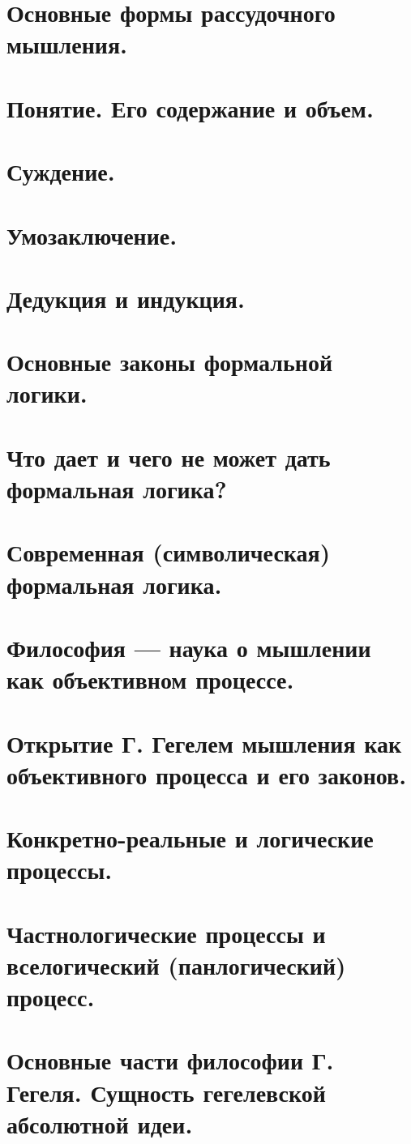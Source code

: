 \section{ Основные формы рассудочного мышления.}
\section{ Понятие. Его содержание и объем.}
\section{ Суждение.}
\section{ Умозаключение.}
\section{ Дедукция и индукция.}
\section{ Основные законы формальной логики.}
\section{ Что дает и чего не может дать формальная логика?}
\section{ Современная (символическая) формальная логика.}
\section{ Философия — наука о мышлении как объективном процессе.}
\section{ Открытие Г. Гегелем мышления как объективного процесса и его законов.}
\section{ Конкретно-реальные и логические процессы.}
\section{ Частнологические процессы и вселогический (панлогический) процесс.}
\section{ Основные части философии Г. Гегеля. Сущность гегелевской абсолютной идеи.}
